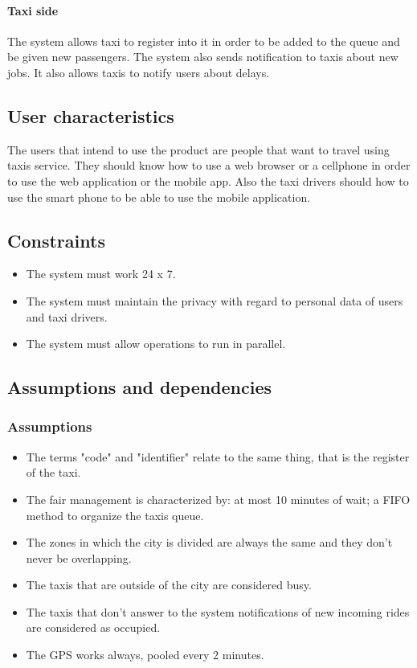 		\paragraph{Taxi side}The system allows taxi to register into it in order to be added to the queue and be given new passengers. The system also sends notification to taxis about new jobs. It also allows taxis to notify users about delays.
	\subsection{User characteristics}
    The users that intend to use the product are people that want to travel using taxis service. They should know how to use a web browser or a cellphone in order to use the web application or the mobile app. 
    Also the taxi drivers should how to use the smart phone to be able to use the mobile application.
	\subsection{Constraints}
	    \begin{itemize}
	    \item The system must work 24 x 7.
	    \item The system must maintain the privacy with regard to personal data of users and taxi drivers.
	    \item The system must allow operations to run in parallel.
	    \end{itemize}
	\subsection{Assumptions and dependencies}
		\subsubsection{Assumptions}
	    \begin{itemize}
	    \item The terms "code" and "identifier" relate to the same thing, that is the register of the taxi.
	    \item The fair management is characterized by: at most 10 minutes of wait; a FIFO method to organize the taxis queue.
	    \item The zones in which the city is divided are always the same and they don't never be overlapping.
	    \item The taxis that are outside of the city are considered busy.
	    \item The taxis that don't answer to the system notifications of new incoming rides are considered as occupied.
	    \item The GPS works always, pooled every 2 minutes.
	    \end{itemize}